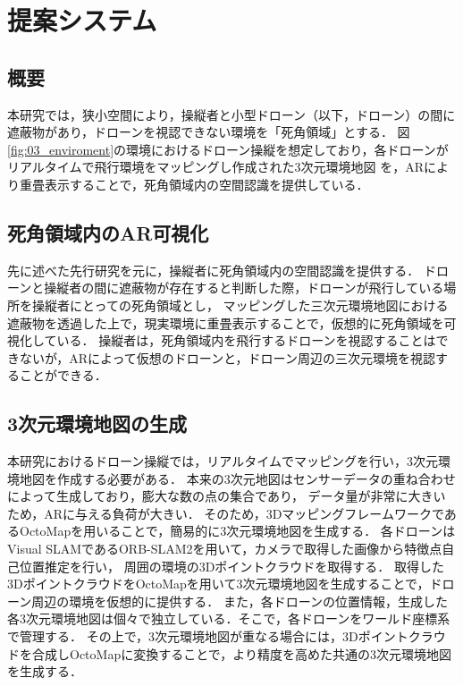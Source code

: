 \documentclass[a4paper,10pt,twocolumn,uplatex]{jsarticle}
\begin{document}
\section{提案システム}
\subsection{概要}
本研究では，狭小空間により，操縦者と小型ドローン（以下，ドローン）の間に遮蔽物があり，ドローンを視認できない環境を「死角領域」とする．
図\ref{fig:03_enviroment}の環境におけるドローン操縦を想定しており，各ドローンがリアルタイムで飛行環境をマッピングし作成された3次元環境地図
を，ARにより重畳表示することで，死角領域内の空間認識を提供している．
\par

\subsection{死角領域内のAR可視化}
先に述べた先行研究\cite{Erat}を元に，操縦者に死角領域内の空間認識を提供する．
ドローンと操縦者の間に遮蔽物が存在すると判断した際，ドローンが飛行している場所を操縦者にとっての死角領域とし，
マッピングした三次元環境地図における遮蔽物を透過した上で，現実環境に重畳表示することで，仮想的に死角領域を可視化している．
操縦者は，死角領域内を飛行するドローンを視認することはできないが，ARによって仮想のドローンと，ドローン周辺の三次元環境を視認することができる．

\subsection{3次元環境地図の生成}
本研究におけるドローン操縦では，リアルタイムでマッピングを行い，3次元環境地図を作成する必要がある．
本来の3次元地図はセンサーデータの重ね合わせによって生成しており，膨大な数の点の集合であり，
データ量が非常に大きいため，ARに与える負荷が大きい．
そのため，3DマッピングフレームワークであるOctoMapを用いることで，簡易的に3次元環境地図を生成する．
各ドローンはVisual SLAMであるORB-SLAM2を用いて，カメラで取得した画像から特徴点自己位置推定を行い，
周囲の環境の3Dポイントクラウドを取得する．
取得した3DポイントクラウドをOctoMapを用いて3次元環境地図を生成することで，ドローン周辺の環境を仮想的に提供する．
また，各ドローンの位置情報，生成した各3次元環境地図は個々で独立している．そこで，各ドローンをワールド座標系で管理する．
その上で，3次元環境地図が重なる場合には，3Dポイントクラウドを合成しOctoMapに変換することで，より精度を高めた共通の3次元環境地図を生成する．
\end{document}
